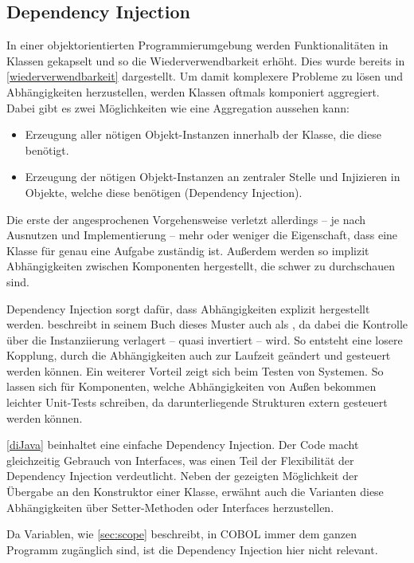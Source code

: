 \subsection{Dependency Injection}\label{depi}
In einer objektorientierten Programmierumgebung werden Funktionalitäten in Klassen gekapselt und so die Wiederverwendbarkeit erhöht. Dies wurde bereits in \autoref{wiederverwendbarkeit} dargestellt. Um damit komplexere Probleme zu lösen und Abhängigkeiten herzustellen, werden Klassen oftmals komponiert \bzw aggregiert. Dabei gibt es zwei Möglichkeiten wie eine Aggregation aussehen kann:

\begin{itemize}
    \item Erzeugung aller nötigen Objekt-Instanzen innerhalb der Klasse, die diese benötigt.
    \item Erzeugung der nötigen Objekt-Instanzen an zentraler Stelle und Injizieren in Objekte, welche diese benötigen (Dependency Injection). 
\end{itemize}

Die erste der angesprochenen Vorgehensweise verletzt allerdings -- je nach Ausnutzen und Implementierung -- mehr oder weniger die Eigenschaft, dass eine Klasse für genau eine Aufgabe zuständig ist. Außerdem werden so implizit Abhängigkeiten zwischen Komponenten hergestellt, die schwer zu durchschauen sind.


Dependency Injection sorgt dafür, dass Abhängigkeiten explizit hergestellt werden. \citeauthor{martin_clean_2008} beschreibt in seinem Buch  dieses Muster auch als , da dabei die Kontrolle über die Instanziierung verlagert -- quasi invertiert -- wird. So entsteht eine losere Kopplung, durch die Abhängigkeiten auch zur Laufzeit geändert und gesteuert werden können. Ein weiterer Vorteil zeigt sich beim Testen von Systemen. So lassen sich für Komponenten, welche Abhängigkeiten von Außen bekommen leichter Unit-Tests schreiben, da darunterliegende Strukturen extern gesteuert werden können.

\autoref{diJava} beinhaltet eine einfache Dependency Injection. Der Code macht gleichzeitig Gebrauch von Interfaces, was einen Teil der Flexibilität der Dependency Injection verdeutlicht. Neben der gezeigten Möglichkeit der Übergabe an den Konstruktor einer Klasse, erwähnt \citeauthor{martin_clean_2008} \cite{martin_clean_2008} auch die Varianten diese Abhängigkeiten über Setter-Methoden oder Interfaces herzustellen.

Da Variablen, wie \autoref{sec:scope} beschreibt, in COBOL immer dem ganzen Programm zugänglich sind, ist die Dependency Injection hier nicht relevant.